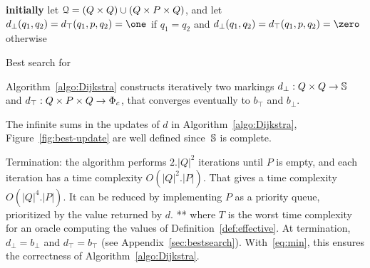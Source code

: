 
\begin{algorithm}

\textbf{initially} let $\mathcal{Q} = (Q \times Q) \cup (Q \times P \times Q)$,
and let $d_\bot(q_1, q_2) = d_\top(q_1, p, q_2) = \one$
if $q_1 = q_2$ and $d_\bot(q_1, q_2) = d_\top(q_1, p, q_2) = \zero$ otherwise$\;$

\smallskip\noindent
{}
\caption{Best search for \SWVPA}
\label{algo:Dijkstra}
\end{algorithm}

Algorithm~\ref{algo:Dijkstra}
constructs iteratively two markings
$d_\bot : Q \times Q \to \mathbb{S}$ and
$d_\top : Q \times P \times Q \to \Phic$,
that converges eventually to $b_\top$ and $b_\bot$.

The infinite sums in the updates of $d$ in Algorithm~\ref{algo:Dijkstra},
Figure~\ref{fig:best-update}
are well defined
since~$\mathbb{S}$ is complete.


Termination: the algorithm performs $2.|Q|^2$ iterations until $P$ is empty,
and each iteration has a time complexity $O(|Q|^2 . |P|)$.
That gives a time complexity $O(|Q|^4 . |P|)$.
It can be reduced by implementing $P$ as a priority queue,
prioritized by the value returned by $d$.
** where  $T$ is the worst time complexity for an oracle computing the values
of Definition~\ref{def:effective}.
%
At termination, $d_\bot = b_\bot$ and $d_\top = b_\top$
(see Appendix~\ref{sec:bestsearch}).
With~\eqref{eq:min}, this ensures
the correctness of Algorithm~\ref{algo:Dijkstra}.

